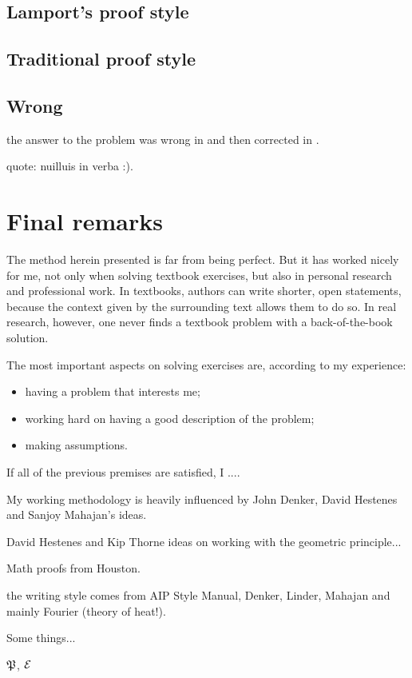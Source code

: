 \subsection{Lamport's proof style}
%


\subsection{Traditional proof style}
%



\subsection{Wrong}
%
the answer to the problem was wrong in \cite{thorne:2011} and then corrected in \cite{thorne:2013}.

quote: nuilluis in verba :).


\section{Final remarks}
%
The method herein presented is far from being perfect. But it has worked nicely for me, not only when solving textbook exercises, but also in personal research and professional work. In textbooks, authors can write shorter, open statements, because the context given by the surrounding text allows them to do so. In real research, however, one never finds a textbook problem with a back-of-the-book solution.

The most important aspects on solving exercises are, according to my experience:
%
\begin{itemize}
%
\item having a problem that interests me;
%
\item working hard on having a good description of the problem;
%
\item making assumptions.
%
\end{itemize}
%
If all of the previous premises are satisfied, I ....

My working methodology is heavily influenced by John Denker, David Hestenes and Sanjoy Mahajan's ideas.

David Hestenes and Kip Thorne ideas on working with the geometric principle...

Math proofs from Houston.

the writing style comes from AIP Style Manual, Denker, Linder, Mahajan and mainly Fourier (theory of heat!).





Some things...
%
~
%


$\mathfrak{P}$, $\mathcal{E}$
